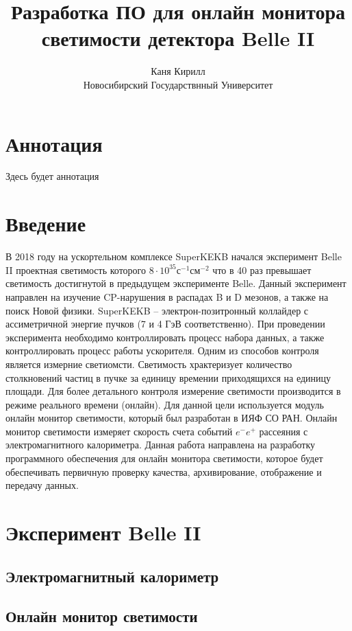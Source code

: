 \documentclass[a4paper, 12pt]{article}
\title{Разработка ПО для онлайн монитора светимости детектора Belle II}
\author{Каня Кирилл\\Новосибирский Государствнный Университет}
\begin{document}
\maketitle
\newpage

\section*{Аннотация}
Здесь будет аннотация
\newpage

\tableofcontents
\newpage

\section{Введение}
В 2018 году на ускортельном комплексе SuperKEKB начался эксперимент Belle II проектная светимость которого $8\cdot10^{35}$с$^{-1}$см$^{-2}$ что в 40 раз превышает светимость достигнутой в предыдущем эксперименте Belle. Данный эксперимент направлен на изучение CP-нарушения в распадах B и D мезонов, а также на поиск Новой физики. SuperKEKB -- электрон-позитронный коллайдер с ассиметричной энергие пучков (7 и 4 ГэВ соответственно). При проведении эксперимента необходимо контроллировать процесс набора данных, а также контроллировать процесс работы ускорителя. Одним из способов контроля является измерние светиомсти. Светимость храктеризует количество столкновений частиц в пучке за единицу времении приходящихся на единицу площади. Для более детального контроля измерение светимости производится в режиме реального времени (онлайн). Для данной цели используется модуль онлайн монитор светимости, который был разработан в ИЯФ СО РАН. Онлайн монитор светимости измеряет скорость счета событий $e^-e^+$ рассеяния с электромагнитного калориметра. Данная работа направлена на разработку программного обеспечения для онлайн монитора светимости, которое будет обеспечивать первичную проверку качества, архивирование, отображение и передачу данных.\par

\section{Эксперимент Belle II}
    \subsection{Электромагнитный калориметр}
    
    \subsection{Онлайн монитор светимости}
    
\end{document}
